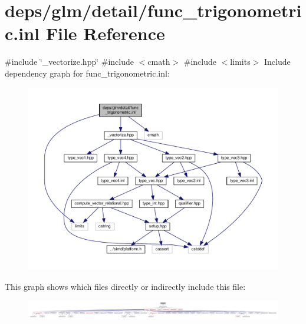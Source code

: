 \hypertarget{func__trigonometric_8inl}{}\section{deps/glm/detail/func\+\_\+trigonometric.inl File Reference}
\label{func__trigonometric_8inl}
{\ttfamily \#include \char`\"{}\+\_\+vectorize.\+hpp\char`\"{}}\newline
{\ttfamily \#include $<$cmath$>$}\newline
{\ttfamily \#include $<$limits$>$}\newline
Include dependency graph for func\+\_\+trigonometric.\+inl\+:
\nopagebreak
\begin{figure}[H]
\begin{center}
\leavevmode
\includegraphics[width=350pt]{de/d1b/func__trigonometric_8inl__incl}
\end{center}
\end{figure}
This graph shows which files directly or indirectly include this file\+:
\nopagebreak
\begin{figure}[H]
\begin{center}
\leavevmode
\includegraphics[width=350pt]{d7/dba/func__trigonometric_8inl__dep__incl}
\end{center}
\end{figure}
